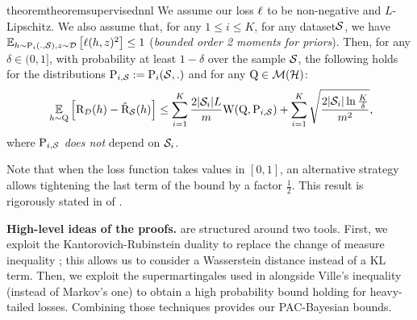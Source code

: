 \begin{restatable}{theorem}{theoremsupervisednnl}
\label{theorem:supervised-nnl}
We assume our loss $\loss$ to be non-negative and $L$-Lipschitz. We also assume that, for any $1\leq i\leq K$, for any dataset$\S$, we have $\EE_{h\sim \P_{i}(.,\S), z\sim \D}\LB \loss(h,z)^2 \RB \leq 1$ (\emph{bounded order 2 moments for priors}).
Then, for any $\delta\in(0,1]$, with probability at least $1-\delta$ over the sample $\S$, the following holds for the distributions $\P_{i,\S}\defeq \P_i(\S,.)$ and for any $\Q\in\Mcal(\H)$: 
\begin{align*}
\ \EE_{h\sim\Q}\Big[ \Risk_{\D}(h) - \Riskhat_{\S}(h) \Big] \le \sum_{i=1}^{K} \frac{2|\S_i|L}{m} \W(\Q, \P_{i,\S}) + \sum_{i=1}^{K} \sqrt{\frac{2|\S_i|\ln\frac{K}{\delta}}{m^2}}, 
\end{align*}
where $\P_{i,\S}$ {\it does not} depend on $\S_i$.
\end{restatable}

Note that when the loss function takes values in $[0,1]$, an alternative strategy allows tightening the last term of the bound by a factor $\frac{1}{2}$.
This result is rigorously stated in  of . 

\textbf{High-level ideas of the proofs.}
 are structured around two tools.
First, we exploit the Kantorovich-Rubinstein duality \cite[Remark 6.5]{villani2009optimal} to replace the change of measure inequality \cite{csizar1975divergence,donsker1976asymptotic}; this allows us to consider a Wasserstein distance instead of a KL term.
Then, we exploit the supermartingales used in \cite{haddouche2023pac,chugg2023unified} alongside Ville's inequality (instead of Markov's one) to obtain a high probability bound holding for heavy-tailed losses.
Combining those techniques provides our PAC-Bayesian bounds.

